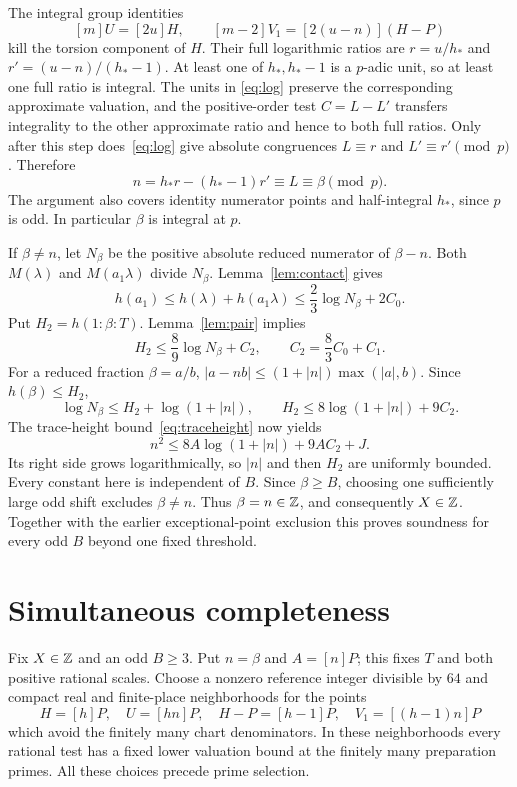 \documentclass[11pt,a4paper]{article}
\begin{document}
The integral group identities
\[
                [m]U=[2u]H,\qquad
                [m-2]V_1=[2(u-n)](H-P)
\]
kill the torsion component of $H$. Their full logarithmic ratios are
$r=u/h_*$ and $r'=(u-n)/(h_*-1)$. At least one of $h_*,h_*-1$ is a
$p$-adic unit, so at least one full ratio is integral. The units in
\eqref{eq:log} preserve the corresponding approximate valuation, and
the positive-order test $C=L-L'$ transfers integrality to the other
approximate ratio and hence to both full ratios.
Only after this step does~\eqref{eq:log} give absolute congruences
$L\equiv r$ and $L'\equiv r'\pmod p$. Therefore
\[
 n=h_*r-(h_*-1)r'\equiv L\equiv\beta\pmod p.
\]
The argument also covers identity numerator points and half-integral
$h_*$, since $p$ is odd. In particular $\beta$ is integral at $p$.

If $\beta\ne n$, let $N_\beta$ be the positive absolute reduced
numerator of $\beta-n$. Both $M(\lambda)$ and $M(a_1\lambda)$ divide
$N_\beta$. Lemma~\ref{lem:contact} gives
\[
 h(a_1)\le h(\lambda)+h(a_1\lambda)
               \le\frac23\log N_\beta+2C_0.
\]
Put $H_2=h(1:\beta:T)$. Lemma~\ref{lem:pair} implies
\[
 H_2\le\frac89\log N_\beta+C_2,\qquad C_2=\frac83C_0+C_1.
\]
For a reduced fraction $\beta=a/b$,
$|a-nb|\le(1+|n|)\max(|a|,b)$. Since $h(\beta)\le H_2$,
\[
 \log N_\beta\le H_2+\log(1+|n|),\qquad
 H_2\le8\log(1+|n|)+9C_2.
\]
The trace-height bound~\eqref{eq:traceheight} now yields
\[
 n^2\le8A\log(1+|n|)+9AC_2+J.
\]
Its right side grows logarithmically, so $|n|$ and then $H_2$ are
uniformly bounded. Every constant here is independent of $B$.
Since $\beta\ge B$, choosing one sufficiently large odd shift excludes
$\beta\ne n$. Thus $\beta=n\in\mathbb Z$, and consequently $X\in\mathbb Z$.
Together with the earlier exceptional-point exclusion this proves
soundness for every odd $B$ beyond one fixed threshold.

\section{Simultaneous completeness}

Fix $X\in\mathbb Z$ and an odd $B\ge3$. Put $n=\beta$ and $A=[n]P$;
this fixes $T$ and both positive rational scales. Choose a nonzero
reference integer divisible by $64$ and compact real and finite-place
neighborhoods for the points
\[
 H=[h]P,\quad U=[hn]P,\quad H-P=[h-1]P,\quad
 V_1=[(h-1)n]P
\]
which avoid the finitely many chart denominators. In these neighborhoods
every rational test has a fixed lower valuation bound at the finitely
many preparation primes. All these choices precede prime selection.
\end{document}
